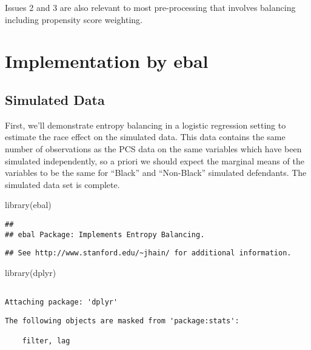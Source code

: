\documentclass[
  letterpaper,
  DIV=11,
  numbers=noendperiod]{scrartcl}
\newenvironment{Shaded}{\begin{snugshade}}{\end{snugshade}}
\newcommand{\FunctionTok}[1]{\textcolor[rgb]{0.28,0.35,0.67}{#1}}
\newcommand{\NormalTok}[1]{\textcolor[rgb]{0.00,0.23,0.31}{#1}}
\begin{document}
Issues 2 and 3 are also relevant to most pre-processing that involves
balancing including propensity score weighting.

\hypertarget{implementation-by-ebal}{%
\section{Implementation by ebal}\label{implementation-by-ebal}}

\hypertarget{simulated-data}{%
\subsection{Simulated Data}\label{simulated-data}}

First, we'll demonstrate entropy balancing in a logistic regression
setting to estimate the race effect on the simulated data. This data
contains the same number of observations as the PCS data on the same
variables which have been simulated independently, so a priori we should
expect the marginal means of the variables to be the same for ``Black''
and ``Non-Black'' simulated defendants. The simulated data set is
complete.

\begin{Shaded}
\begin{Highlighting}[]
\FunctionTok{library}\NormalTok{(ebal)}
\end{Highlighting}
\end{Shaded}

\begin{verbatim}
##
## ebal Package: Implements Entropy Balancing.
\end{verbatim}

\begin{verbatim}
## See http://www.stanford.edu/~jhain/ for additional information.
\end{verbatim}

\begin{Shaded}
\begin{Highlighting}[]
\FunctionTok{library}\NormalTok{(dplyr)}
\end{Highlighting}
\end{Shaded}

\begin{verbatim}

Attaching package: 'dplyr'
\end{verbatim}

\begin{verbatim}
The following objects are masked from 'package:stats':

    filter, lag
\end{verbatim}
\end{document}
